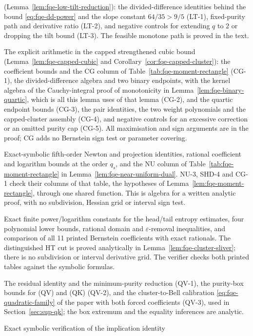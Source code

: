 \begin{description}
(Lemma~\ref{lem:fqe-low-tilt-reduction}): the divided-difference identities behind the bound
\eqref{eq:fqe-dd-power} and the slope constant $64/35>9/5$ (LT-1),
fixed-purity path and derivative ratio (LT-2), and negative controls for extending
$q$ to $2$ or dropping the tilt bound (LT-3). The feasible monotone path is proved
in the text.
\item[CG-1--CG-5] The explicit arithmetic in the capped strengthened cubic bound
(Lemma~\ref{lem:fqe-capped-cubic} and Corollary~\ref{cor:fqe-capped-cluster}): the coefficient bounds and the CG column of
Table~\ref{tab:fqe-moment-rectangle} (CG-1), the divided-difference algebra and two binary endpoints, with the kernel algebra of the Cauchy-integral
proof of monotonicity in Lemma~\ref{lem:fqe-binary-quartic}, which is all this lemma uses of
that lemma (CG-2),
and the quartic endpoint bounds (CG-3), the pair identities, the two weight polynomials and the capped-cluster assembly (CG-4), and
negative controls for an excessive correction or an omitted purity cap (CG-5). All maximisation and
sign arguments are in the proof; CG adds no Bernstein sign test or parameter covering.
\item[NU-1--NU-3] Exact-symbolic fifth-order Newton and projection identities,
rational coefficient and logarithm bounds at the order $q_s$, and the NU column of
Table~\ref{tab:fqe-moment-rectangle} in Lemma~\ref{lem:fqe-near-uniform-dual}.
NU-3, SHD-4 and CG-1 check their columns of that table, the hypotheses of
Lemma~\ref{lem:fqe-moment-rectangle}, through one shared function. This is algebra for a written analytic
proof, with no subdivision, Hessian grid or interval sign test.
\item[SL-1--SL-4] Exact finite power/logarithm constants for the head/tail entropy estimates,
four polynomial lower bounds, rational domain and $\varepsilon$-removal inequalities,
and comparison of all 11 printed Bernstein coefficients with exact rationals.
The distinguished HT cut is proved analytically in Lemma~\ref{lem:fqe-cluster-sliver};
there is no subdivision or interval derivative grid. The verifier checks both printed tables
against the symbolic formulas.
\item[QV-1--QV-3] The residual identity and the minimum-purity reduction (QV-1), the purity-box bounds for (QV) and (QK)
(QV-2), and the cluster-to-Bell calibration
\eqref{eq:fqe-quadratic-family} of the paper with both forced coefficients (QV-3), used in Section~\ref{sec:sup-qk}; the box
extremum and the equality inferences are analytic.
\item[JI-1--JI-3] Exact symbolic verification of the implication identity

\end{description}
